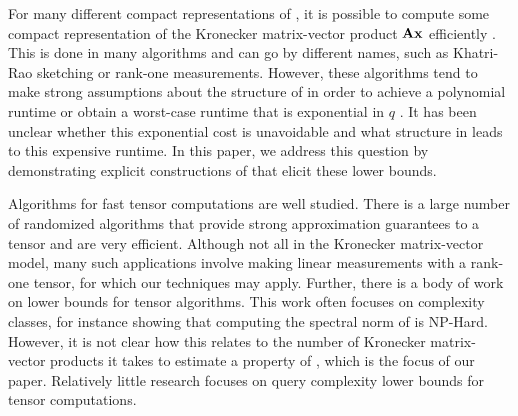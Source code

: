For many different compact representations of \tA, it is possible to compute some compact representation of the Kronecker matrix-vector product \(\mathbf{A}\boldsymbol{\mathrm{x}}\) efficiently \cite{lee2014fundamental,feldman2022entanglement}.
This is done in many algorithms and can go by different names, such as Khatri-Rao sketching or rank-one measurements.
However, these algorithms tend to make strong assumptions about the structure of \mA in order to achieve a polynomial runtime \cite{al2023randomized,li2017near,grasedyck2004existence} or obtain a worst-case runtime that is exponential in \(q\) \cite{meyer2023hutchinson,avron2014subspace,song2019relative}.
It has been unclear whether this exponential cost is unavoidable and what structure in \mA leads to this expensive runtime.
In this paper, we address this question by demonstrating explicit constructions of \mA that elicit these lower bounds.



Algorithms for fast tensor computations are well studied.
There is a large number of randomized algorithms that provide strong approximation guarantees to a tensor and are very efficient. 
Although not all in the Kronecker matrix-vector model, many such applications involve making linear measurements with a rank-one tensor, for which our techniques may apply.
Further, there is a body of work on lower bounds for tensor algorithms.
This work often focuses on complexity classes, for instance showing that computing the spectral norm of \tA is NP-Hard.
However, it is not clear how this relates to the number of Kronecker matrix-vector products it takes to estimate a property of \mA, which is the focus of our paper.
Relatively little research focuses on query complexity lower bounds for tensor computations.



